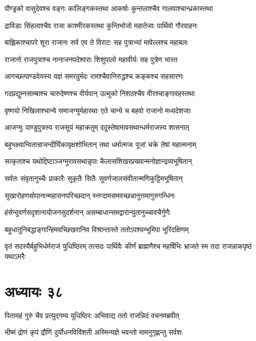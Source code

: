 \twolineshloka
{पौण्ड्रको वासुदेवश्च वङ्गः कालिङ्गकस्तथा}
{आकर्षाः कुन्तलाश्चैव गालवाश्चान्ध्रकास्तथा}


\twolineshloka
{द्राविडाः सिंहलाश्चैव राजा काश्मीरकस्तथा}
{कुन्तिभोजो महातेजाः पार्थिवो गौरवाहनः}


\twolineshloka
{बाह्लिकाश्चापरे शूरा राजानः सर्व एव ते}
{विराटः सह पुत्राभ्यां मावेल्लश्च महाबलः}


\twolineshloka
{राजानो राजपुत्राश्च नानाजनपदेश्वराः}
{शिशुपालो महावीर्यः सह पुत्रेण भारत}


\twolineshloka
{आगच्छत्पाण्डवेयस्य यज्ञं समरदुर्मदः}
{रामश्चैवानिरुद्धश्च कङ्कश्च सहसारणः}


\twolineshloka
{गदप्रद्युम्नसाम्बाश्च चारुदेष्णश्च वीर्यवान्}
{उल्मुको निशठश्चैव वीरश्चाङ्गावहस्तथा}


\twolineshloka
{वृष्णयो निखिलाश्चान्ये समाजग्मुर्महारथाः}
{एते चान्ये च बहवो राजानो मध्यदेशजाः}


\twolineshloka
{आजग्मुः पाण्डुपुत्रस्य राजसूयं महाक्रतुम्}
{ददुस्तेषामावसथान्धर्मराजस्य शासनात्}


\twolineshloka
{बहुभक्ष्यान्वितान्राजन्दीर्घिकावृक्षशोभितान्}
{तथा धर्मात्मजः पूजां चक्रे तेषां महात्मनाम्}


\twolineshloka
{सत्कृताश्च यथोद्दिष्टाञ्जग्मुरावसथान्नृपाः}
{कैलासशिखरप्रख्यान्मनोज्ञान्द्रव्यभूषितान्}


\twolineshloka
{सर्वतः संवृतानुच्चैः प्राकारैः सुकृतैः सितैः}
{सुवर्णजालसंवीतान्मणिकुट्टिमभूषितान्}


\twolineshloka
{सुखारोहणसोपानान्महासनपरिच्छदान्}
{स्नग्दामसमवच्छन्नानुत्तमागुरुगन्धिनः}


\twolineshloka
{हंसेन्दुवर्णसदृशानायोजनसुदर्शनान्}
{असम्बाधान्समद्वारान्युतानुच्चावचैर्गुणैः}


\twolineshloka
{बहुधातुनिबद्धाङ्गान्हिमवच्छिखरानिव}
{विश्रान्तास्ते ततोऽपश्यन्भूमिपा भूरिदक्षिणम्}


\threelineshloka
{वृतं सदस्यैर्बहुभिर्धर्मराजं युधिष्ठिरम्}
{तत्सदः पार्थिवैः कीर्णं ब्राह्मणैश्च महर्षिभिः}
{भ्राजते स्म तदा राजन्नाकपृष्ठं यथाऽमरैः}


\chapter{अध्यायः ३८}
\twolineshloka
{पितामहं गुरुं चैव प्रत्युद्गम्य युधिष्ठिरः}
{अभिवाद्य ततो राजन्निदं वचनमब्रवीत्}


\twolineshloka
{भीष्मं द्रोणं कृपं द्रौणिं दुर्योधनविविंशती}
{अस्मिन्यज्ञे भवन्तो मामनुगृह्णन्तु सर्वशः}


